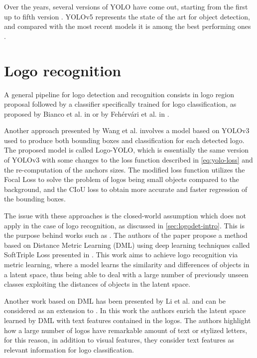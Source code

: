 Over the years, several versions of YOLO have come out, starting from the first up to fifth version \cite{redmon2016you, redmon2017yolo9000, redmon2018yolov3, bochkovskiy2020yolov4, glenn_jocher_2021_5563715}. YOLOv5 represents the state of the art for object detection, and compared with the most recent models it is among the best performing ones \cite{zaidi2022survey}.

\section{Logo recognition}
\label{sec:sota-logoyolo}

A general pipeline for logo detection and recognition consists in logo region proposal followed by a classifier specifically trained for logo classification, as proposed by Bianco et al. in \cite{bianco2017deep} or by Fehérvári et al. in \cite{fehervari2019scalable}.

Another approach presented by Wang et al. \cite{wang2022logodet} involves a model based on YOLOv3 \cite{redmon2018yolov3} used to produce both bounding boxes and classification for each detected logo. The proposed model is called Logo-YOLO, which is essentially the same version of YOLOv3 with some changes to the loss function described in \autoref{eq:yolo-loss} and the re-computation of the anchors sizes. The modified loss function utilizes the Focal Loss \cite{lin2017focal} to solve the problem of logos being small objects compared to the background, and the  CIoU loss \cite{zheng2020distance} to obtain more accurate and faster regression of the bounding boxes.

The issue with these approaches is the closed-world assumption which does not apply in the case of logo recognition, as discussed in \autoref{sec:logodet-intro}. This is the purpose behind works such as \cite{fehervari2019scalable}. The authors of the paper propose a method based on Distance Metric Learning (DML) using deep learning techniques called SoftTriple Loss presented in \cite{qian2019softtriple}. This work aims to achieve logo recognition via metric learning, where a model learns the similarity and differences of objects in a latent space, thus being able to deal with a large number of previously unseen classes exploiting the distances of objects in the latent space.

Another work based on DML has been presented by Li et al. \cite{li2022seetek} and can be considered as an extension to \cite{fehervari2019scalable}. In this work the authors enrich the latent space learned by DML with text features contained in the logos. The authors highlight how a large number of logos have remarkable amount of text or stylized letters, for this reason, in addition to visual features, they consider text features as relevant information for logo classification.

